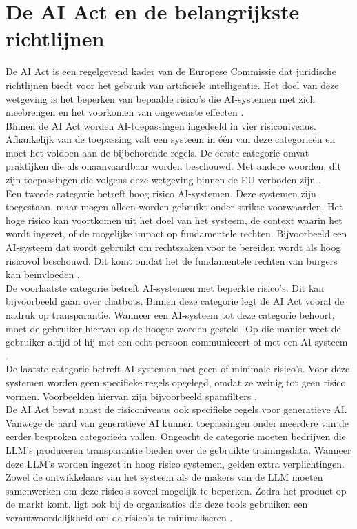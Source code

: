\section{De AI Act en de belangrijkste richtlijnen}
De AI Act is een regelgevend kader van de Europese Commissie dat juridische richtlijnen biedt voor het gebruik van artificiële intelligentie. Het doel van deze wetgeving is het beperken van bepaalde risico’s die AI-systemen met zich meebrengen en het voorkomen van ongewenste effecten \autocite{EUAIAct2024}.
\\[1em]
Binnen de AI Act worden AI-toepassingen ingedeeld in vier risiconiveaus. Afhankelijk van de toepassing valt een systeem in één van deze categorieën en moet het voldoen aan de bijbehorende regels. De eerste categorie omvat praktijken die als onaanvaardbaar worden beschouwd. Met andere woorden, dit zijn toepassingen die volgens deze wetgeving binnen de EU verboden zijn \autocite{EUAIAct2024}.
\\[1em]
Een tweede categorie betreft hoog risico AI-systemen. Deze systemen zijn toegestaan, maar mogen alleen worden gebruikt onder strikte voorwaarden. Het hoge risico kan voortkomen uit het doel van het systeem, de context waarin het wordt ingezet, of de mogelijke impact op fundamentele rechten. Bijvoorbeeld een AI-systeem dat wordt gebruikt om rechtszaken voor te bereiden wordt als hoog risicovol beschouwd. Dit komt omdat het de fundamentele rechten van burgers kan beïnvloeden \autocite{EUAIAct2024}.
\\[1em]
De voorlaatste categorie betreft AI-systemen met beperkte risico’s. Dit kan bijvoorbeeld gaan over chatbots. Binnen deze categorie legt de AI Act vooral de nadruk op transparantie. Wanneer een AI-systeem tot deze categorie behoort, moet de gebruiker hiervan op de hoogte worden gesteld. Op die manier weet de gebruiker altijd of hij met een echt persoon communiceert of met een AI-systeem \autocite{EUAIAct2024}.
\\[1em]
De laatste categorie betreft AI-systemen met geen of minimale risico’s. Voor deze systemen worden geen specifieke regels opgelegd, omdat ze weinig tot geen risico vormen. Voorbeelden hiervan zijn bijvoorbeeld spamfilters \autocite{EUAIAct2024}.
\\[1em]
De AI Act bevat naast de risiconiveaus ook specifieke regels voor generatieve AI. Vanwege de aard van generatieve AI kunnen toepassingen onder meerdere van de eerder besproken categorieën vallen. Ongeacht de categorie moeten bedrijven die LLM’s produceren transparantie bieden over de gebruikte trainingsdata. Wanneer deze LLM’s worden ingezet in hoog risico systemen, gelden extra verplichtingen. Zowel de ontwikkelaars van het systeem als de makers van de LLM moeten samenwerken om deze risico’s zoveel mogelijk te beperken. Zodra het product op de markt komt, ligt ook bij de organisaties die deze tools gebruiken een verantwoordelijkheid om de risico’s te minimaliseren \autocite{EUAIAct2024}.
